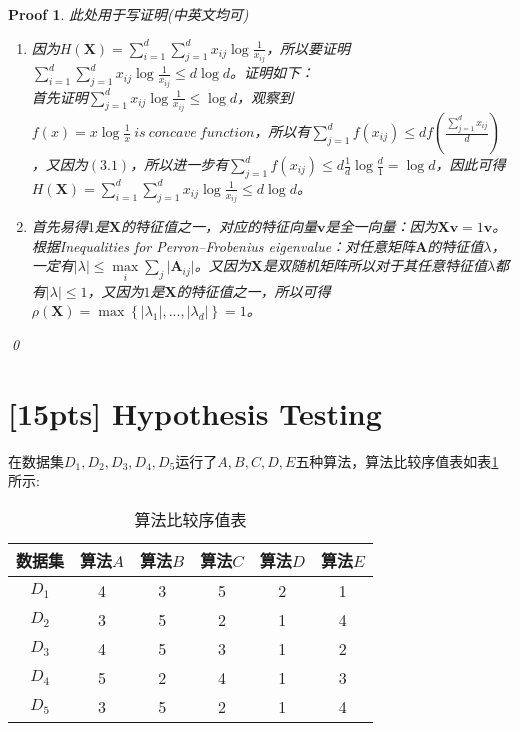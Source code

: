\documentclass[a4paper,UTF8]{article}
\numberwithin{equation}{section}
\newtheorem*{myProof}{Proof}
\begin{document}
\begin{myProof}
此处用于写证明(中英文均可)

\begin{enumerate}
\item 
因为$H(\mathbf{X})=\sum_{i=1}^{d}\sum_{j=1}^{d}x_{ij}\log \frac{1}{x_{ij}}$，所以要证明$\sum_{i=1}^{d}\sum_{j=1}^{d}x_{ij}\log \frac{1}{x_{ij}} \leq d\log d$。证明如下：\\
首先证明$\sum_{j=1}^{d}x_{ij}\log\frac{1}{x_{ij}}\leq \log d$，观察到$f(x) = x\log \frac{1}{x}\ is\ concave\ function$，所以有$\sum_{j=1}^{d}f(x_{ij}) \leq df(\frac{\sum_{j=1}^{d}x_{ij}}{d})$，又因为$(3.1)$，所以进一步有$\sum_{j=1}^{d}f(x_{ij}) \leq d\frac{1}{d}\log \frac{d}{1} = \log d$，因此可得$H(\mathbf{X})=\sum_{i=1}^{d}\sum_{j=1}^{d}x_{ij}\log \frac{1}{x_{ij}} \leq d\log d$。

\item 
首先易得$1$是$\mathbf{X}$的特征值之一，对应的特征向量$\mathbf{v}$是全一向量：因为$\mathbf{X}\mathbf{v} = 1\mathbf{v}$。\\
根据Inequalities for Perron–Frobenius eigenvalue：对任意矩阵$\mathbf{A}$的特征值$\lambda$，一定有$\vert\lambda\vert\leq\max\limits_{i}\sum_{j}\vert\mathbf{A}_{ij}\vert$。又因为$\mathbf{X}$是双随机矩阵所以对于其任意特征值$\lambda$都有$\vert\lambda\vert\leq 1$，又因为$1$是$\mathbf{X}$的特征值之一，所以可得$\rho(\mathbf{X}) = \max\left\{|\lambda_1|,...,|\lambda_d|\right\} = 1$。
\end{enumerate}

\qed
\end{myProof}
\newpage
\section{[15pts] Hypothesis Testing} 
在数据集$D_1,D_2,D_3,D_4,D_5$运行了$A,B,C,D,E$五种算法，算法比较序值表如表\ref{table:ranking}所示:
\begin{table}[h]
\centering
\caption{算法比较序值表} \vspace{2mm}
\label{table:ranking}
\begin{tabular}{c|c c c c c}\hline
数据集 		& 算法$A$  	&算法$B$  	& 算法$C$ 	& 算法$D$  	&算法$E$ 	\\ \hline
$D_1$ 		& 4 		&  3  		& 5  		&  2 		& 1			\\
$D_2$ 		& 3 		&  5  		& 2  		&  1 		& 4			\\
$D_3$ 		& 4 		&  5  		& 3  		&  1 		& 2			\\ 
$D_4$ 		& 5 		&  2  		& 4  		&  1 		& 3			\\ 
$D_5$ 		& 3 		&  5  		& 2  		&  1 		& 4			\\ \hline
\end{tabular}
\end{table}
\end{document}
